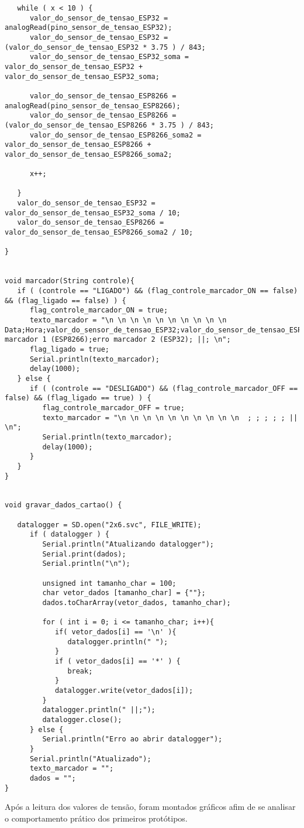 \begin{lstlisting}
   while ( x < 10 ) {
      valor_do_sensor_de_tensao_ESP32 = analogRead(pino_sensor_de_tensao_ESP32);
      valor_do_sensor_de_tensao_ESP32 = (valor_do_sensor_de_tensao_ESP32 * 3.75 ) / 843;
      valor_do_sensor_de_tensao_ESP32_soma = valor_do_sensor_de_tensao_ESP32 + valor_do_sensor_de_tensao_ESP32_soma;
      
      valor_do_sensor_de_tensao_ESP8266 = analogRead(pino_sensor_de_tensao_ESP8266);
      valor_do_sensor_de_tensao_ESP8266 = (valor_do_sensor_de_tensao_ESP8266 * 3.75 ) / 843;
      valor_do_sensor_de_tensao_ESP8266_soma2 = valor_do_sensor_de_tensao_ESP8266 + valor_do_sensor_de_tensao_ESP8266_soma2;
      
      x++;

   }
   valor_do_sensor_de_tensao_ESP32 = valor_do_sensor_de_tensao_ESP32_soma / 10;
   valor_do_sensor_de_tensao_ESP8266 = valor_do_sensor_de_tensao_ESP8266_soma2 / 10;

}


void marcador(String controle){
   if ( (controle == "LIGADO") && (flag_controle_marcador_ON == false) && (flag_ligado == false) ) {
      flag_controle_marcador_ON = true;
      texto_marcador = "\n \n \n \n \n \n \n \n \n \n Data;Hora;valor_do_sensor_de_tensao_ESP32;valor_do_sensor_de_tensao_ESP8266;erro marcador 1 (ESP8266);erro marcador 2 (ESP32); ||; \n";
      flag_ligado = true;
      Serial.println(texto_marcador);
      delay(1000);
   } else {
      if ( (controle == "DESLIGADO") && (flag_controle_marcador_OFF == false) && (flag_ligado == true) ) {
         flag_controle_marcador_OFF = true;
         texto_marcador = "\n \n \n \n \n \n \n \n \n \n  ; ; ; ; ; || \n";
         Serial.println(texto_marcador);
         delay(1000);
      } 
   }
}


void gravar_dados_cartao() {
   
   datalogger = SD.open("2x6.svc", FILE_WRITE);
      if ( datalogger ) {
         Serial.println("Atualizando datalogger");
         Serial.print(dados);
         Serial.println("\n");

         unsigned int tamanho_char = 100;
         char vetor_dados [tamanho_char] = {""};
         dados.toCharArray(vetor_dados, tamanho_char);

         for ( int i = 0; i <= tamanho_char; i++){
            if( vetor_dados[i] == '\n' ){
               datalogger.println(" ");
            }
            if ( vetor_dados[i] == '*' ) {
               break;
            }
            datalogger.write(vetor_dados[i]);
         }
         datalogger.println(" ||;");
         datalogger.close();
      } else {
         Serial.println("Erro ao abrir datalogger");
      }
      Serial.println("Atualizado");
      texto_marcador = "";
      dados = "";
}
\end{lstlisting}


{
Após a leitura dos valores de tensão, foram montados gráficos afim de se analisar o comportamento prático dos primeiros protótipos.
}


